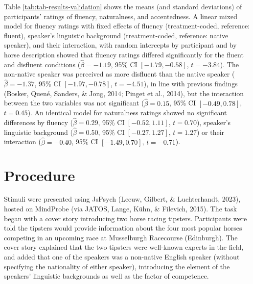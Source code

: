 \documentclass[
  man,floatsintext]{apa6}
\begin{document}
Table \ref{tab:tab-results-validation} shows the means (and standard deviations) of participants' ratings of fluency, naturalness, and accentedness. A linear mixed model for fluency ratings with fixed effects of fluency (treatment-coded, reference: fluent), speaker's linguistic background (treatment-coded, reference: native speaker), and their interaction, with random intercepts by participant and by horse description showed that fluency ratings differed significantly for the fluent and disfluent conditions (\(\hat{\beta} = -1.19\), 95\% CI \([-1.79, -0.58]\), \(t = -3.84\)). The non-native speaker was perceived as more disfluent than the native speaker (\(\hat{\beta} = -1.37\), 95\% CI \([-1.97, -0.78]\), \(t = -4.51\)), in line with previous findings (Bosker, Quené, Sanders, \& Jong, 2014; Pinget et al., 2014), but the interaction between the two variables was not significant (\(\hat{\beta} = 0.15\), 95\% CI \([-0.49, 0.78]\), \(t = 0.45\)). An identical model for naturalness ratings showed no significant differences by fluency (\(\hat{\beta} = 0.29\), 95\% CI \([-0.52, 1.11]\), \(t = 0.70\)), speaker's linguistic background (\(\hat{\beta} = 0.50\), 95\% CI \([-0.27, 1.27]\), \(t = 1.27\)) or their interaction (\(\hat{\beta} = -0.40\), 95\% CI \([-1.49, 0.70]\), \(t = -0.71\)).

\hypertarget{procedure}{%
\section{Procedure}\label{procedure}}

Stimuli were presented using JsPsych (Leeuw, Gilbert, \& Luchterhandt, 2023), hosted on MindProbe (via JATOS, Lange, Kühn, \& Filevich, 2015). The task began with a cover story introducing two horse racing tipsters. Participants were told the tipsters would provide information about the four most popular horses competing in an upcoming race at Musselburgh Racecourse (Edinburgh). The cover story explained that the two tipsters were well-known experts in the field, and added that one of the speakers was a non-native English speaker (without specifying the nationality of either speaker), introducing the element of the speakers' linguistic backgrounds as well as the factor of competence.
\end{document}
